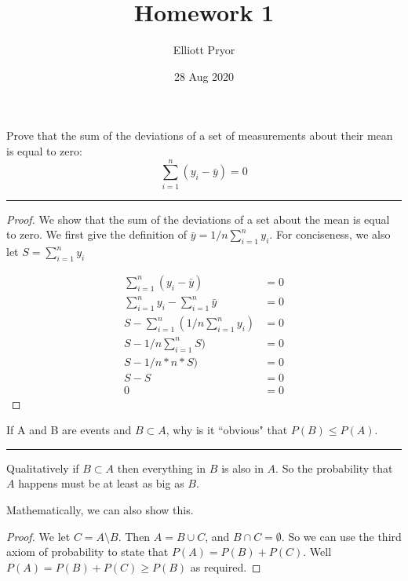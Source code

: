 \documentclass[11pt]{article}
\title{Homework 1}
\author{Elliott Pryor}
\date{28 Aug 2020}
\begin{document}
\maketitle

Prove that the sum of the deviations of a set of measurements about their mean is equal to zero:
$$\sum_{i=1}^n (y_i - \bar{y}) = 0$$
\hrule

\begin{proof}
We show that the sum of the deviations of a set about the mean is equal to zero. We first give the definition of $\bar{y} = 1/n \sum_{i=1}^n y_i$. For conciseness, we also let $S = \sum_{i=1}^n y_i$

\begin{align*}
\sum_{i=1}^n (y_i - \bar{y}) &= 0\\
\sum_{i=1}^n y_i - \sum_{i=1}^n \bar{y} &= 0\\
S - \sum_{i=1}^n (1/n \sum_{i=1}^n y_i) &= 0\\
S - 1/n \sum_{i=1}^n S) &= 0\\
S - 1/n * n * S) &= 0\\
S - S &= 0\\
0 &= 0
\end{align*}

\end{proof}




If A and B are events and $B \subset A$, why is it ``obvious" that $P(B) \leq P(A)$.
\hrule

Qualitatively if $B \subset A$ then everything in $B$ is also in $A$. So the probability that $A$ happens must be at least as big as $B$. 

Mathematically, we can also show this.
\begin{proof}
 We let $C = A \setminus B$. Then $A = B \cup C$, and $B \cap C = \emptyset$. So we can use the third axiom of probability to state that $P(A) = P(B) + P(C)$. Well $P(A) = P(B) + P(C) \geq P(B)$ as required.
\end{proof}
 
 
 
\end{document}
